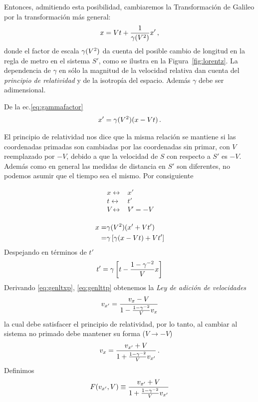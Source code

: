\begin{frame}
Entonces, admitiendo esta posibilidad, cambiaremos la Transformación de Galileo por la transformación más general:
\begin{align}
  \label{eq:gammafactor}
  x=Vt+\frac{1}{\gamma(V^2)} x'\,,
\end{align}
donde el factor de escala $\gamma(V^2)$ da cuenta del posible cambio de longitud en la regla de metro en el sistema $S'$, como se ilustra en la Figura~\ref{fig:lorentz}. 
La dependencia de $\gamma$ en sólo la magnitud de la velocidad relativa dan cuenta del \emph{principio de relatividad} y de la isotropía del espacio. Además $\gamma$ debe ser adimensional.

De la ec.\eqref{eq:gammafactor}
\begin{align}
\label{eq:genltxp}
  x'=\gamma(V^2)(x-V t)\,.
\end{align}
\begin{details}
El principio de relatividad nos dice que la misma relación se mantiene si las coordenadas primadas son cambiadas por las coordenadas sin primar, con $V$ reemplazado por $-V$, debido a que la velocidad de $S$ con respecto a $S'$ es $-V$. Además como en general las medidas de distancia en $S'$ son diferentes, no podemos asumir que el tiempo sea el mismo. Por consiguiente
\end{details}
\begin{onlybeamer}
  \begin{align*}
    x\longleftrightarrow& x'\\
    t\longleftrightarrow& t'\\
    V\longleftrightarrow& V'=-V\\
  \end{align*}
\end{onlybeamer}
\begin{align*}
    x=&\gamma(V^2)(x'+V t')\nonumber\\
    =&\gamma\left[\gamma(x-V t)+V t'\right]
\end{align*}
Despejando en términos de $t'$ %
\begin{align}
  \label{eq:genlttp}
  t'=\gamma\left[t-\frac{1-\gamma^{-2}}{V}x\right]
\end{align}
Derivando \eqref{eq:genltxp}, \eqref{eq:genlttp} obtenemos la \emph{Ley de adición de velocidades} %
\begin{align*}
  v_{x'}=\frac{v_x-V}{1-\frac{1-\gamma^{-2}}{V}v_x}
\end{align*}
la cual debe satisfacer el principio de relatividad, por lo tanto, al cambiar al sistema no primado debe mantener su forma ($V\to -V$)
\begin{align}
  \label{eq:adicionvel}
  v_{x}=\frac{v_{x'}+V}{1+\frac{1-\gamma^{-2}}{V}v_{x'}}\,.
\end{align}
Definimos
\begin{align*}
  F(v_{x'},V)\equiv\frac{v_{x'}+V}{1+\frac{1-\gamma^{-2}}{V}v_{x'}}
\end{align*}
\end{frame}
